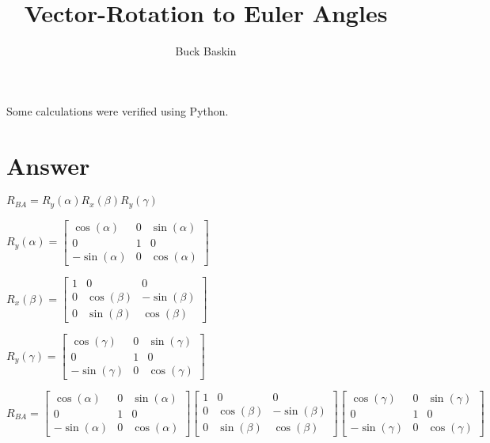 \documentclass[12pt, letterpaper, oneside, notitlepage, onecolumn]{article}
\author{Buck Baskin}
\title{Vector-Rotation to Euler Angles}
\begin{document}
\maketitle

Some calculations were verified using Python.

\section{Answer}

$R_{BA} = R_{y}(\alpha) R_{x}(\beta) R_{y}(\gamma)$

$R_{y} (\alpha) = 
\left[\begin{matrix}\cos{\left (\alpha \right )} & 0 & \sin{\left (\alpha \right )}\\0 & 1 & 0\\- \sin{\left (\alpha \right )} & 0 & \cos{\left (\alpha \right )}\end{matrix}\right]$

$R_{x} (\beta) = 
\left[\begin{matrix}1 & 0 & 0\\0 & \cos{\left (\beta \right )} & - \sin{\left (\beta \right )}\\0 & \sin{\left (\beta \right )} & \cos{\left (\beta \right )}\end{matrix}\right]$

$R_{y} (\gamma) = 
\left[\begin{matrix}\cos{\left (\gamma \right )} & 0 & \sin{\left (\gamma \right )}\\0 & 1 & 0\\- \sin{\left (\gamma \right )} & 0 & \cos{\left (\gamma \right )}\end{matrix}\right]$

$R_{BA} = 
\left[\begin{matrix}\cos{\left (\alpha \right )} & 0 & \sin{\left (\alpha \right )}\\0 & 1 & 0\\- \sin{\left (\alpha \right )} & 0 & \cos{\left (\alpha \right )}\end{matrix}\right]
\left[\begin{matrix}1 & 0 & 0\\0 & \cos{\left (\beta \right )} & - \sin{\left (\beta \right )}\\0 & \sin{\left (\beta \right )} & \cos{\left (\beta \right )}\end{matrix}\right]
\left[\begin{matrix}\cos{\left (\gamma \right )} & 0 & \sin{\left (\gamma \right )}\\0 & 1 & 0\\- \sin{\left (\gamma \right )} & 0 & \cos{\left (\gamma \right )}\end{matrix}\right]$
\end{document}

